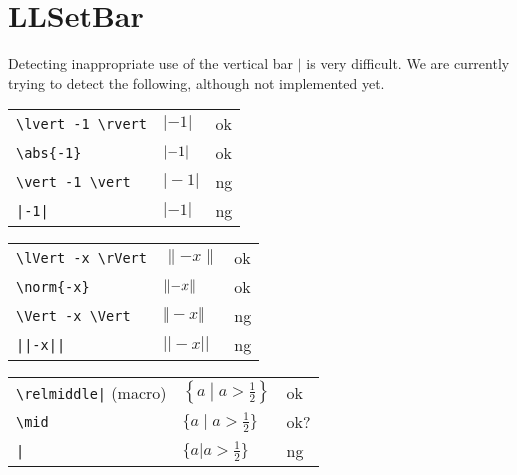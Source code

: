 \documentclass[a4paper]{article}
\newcommand{\tA}[1]{\textcolor{cA}{#1}}
\newcommand{\tC}[1]{\textcolor{cC}{#1}}
\newcommand{\tD}[1]{\textcolor{cD}{#1}}
\begin{document}
\newpage
\appendix

\renewcommand\thesection{Appendix \Alph{section}}

\section{LLSetBar}

Detecting inappropriate use of the vertical bar $|$ is very difficult.
We are currently trying to detect the following, although not implemented yet.

\begin{table}[H]
	\centering
	\begin{tabular}{lll}
		\verb#\lvert -1 \rvert# & $\lvert -1 \rvert$ & \tA{ok} \\
		\verb#\abs{-1}#         & $\abs{-1}$         & \tA{ok} \\
		\verb#\vert -1 \vert#   & $\vert -1 \vert$   & \tD{ng} \\
		\verb#|-1|#             & $|-1|$             & \tD{ng} \\
	\end{tabular}
\end{table}


\begin{table}[H]
	\centering
	\begin{tabular}{lll}
		\verb#\lVert -x \rVert# & $\lVert -x \rVert$ & \tA{ok} \\
		\verb#\norm{-x}#        & $\norm{-x}$        & \tA{ok} \\
		\verb#\Vert -x \Vert#   & $\Vert -x \Vert$   & \tD{ng} \\
		\verb#||-x||#           & $||-x||$           & \tD{ng} \\
	\end{tabular}
\end{table}

\begin{table}[H]
	\centering
	\begin{tabular}{lll}
		\verb#\relmiddle|# (macro) & $\displaystyle{\left\{ a \mathrel{}\middle|\mathrel{} a>\frac{1}{2} \right\}}$ & \tA{ok}  \\
		\verb#\mid#                & $\displaystyle{\{ a \mid a>\frac{1}{2} \}}$                                    & \tC{ok?} \\
		\verb#|#                   & $\displaystyle{\{ a | a>\frac{1}{2} \}}$                                       & \tD{ng}
	\end{tabular}
\end{table}
\end{document}
